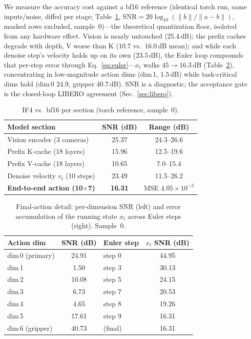 \documentclass[11pt]{article}
\newcommand{\iffour}{IF4}
\newcommand{\bfteen}{bf16}
\begin{document}
We measure the accuracy cost against a \bfteen{} reference (identical torch run,
same inputs/noise, diffed per stage; Table~\ref{tab:quant},
$\mathrm{SNR}{=}20\log_{10}(\lVert b\rVert/\lVert a{-}b\rVert)$, masked rows
excluded, sample~0)---the theoretical quantization floor, isolated from any
hardware effect. Vision is nearly untouched (25.4\,dB); the prefix caches degrade
with depth, V worse than K ($10.7$ vs.\ $16.0$\,dB mean); and while each
denoise step's velocity holds up on its own ($23.5$\,dB), the Euler loop
compounds that per-step error through Eq.~\eqref{eq:euler}---$x_t$
walks $45\!\to\!16.3$\,dB (Table~\ref{tab:quant-detail}), concentrating in
low-magnitude action dims (dim\,1, $1.5$\,dB) while task-critical dims hold
(dim\,0 $24.9$, gripper $40.7$\,dB). SNR is a diagnostic; the acceptance gate is
the closed-loop LIBERO agreement (Sec.~\ref{sec:libero}).

\begin{table}[H]
\centering\small
\caption{\iffour{} vs.\ \bfteen{} per section (torch reference, sample~0).}
\label{tab:quant}
\begin{tabular}{@{}lcc@{}}
\toprule
\textbf{Model section} & \textbf{SNR (dB)} & \textbf{Range (dB)} \\
\midrule
Vision encoder (3 cameras)      & 25.37 & 24.3--26.6 \\
Prefix K-cache (18 layers)      & 15.96 & 12.5--19.6 \\
Prefix V-cache (18 layers)      & 10.65 & 7.0--15.4 \\
Denoise velocity $v_t$ (10 steps) & 23.49 & 11.5--26.2 \\
\midrule
\textbf{End-to-end action (10$\times$7)} & \textbf{16.31} & MSE $4.05{\times}10^{-3}$ \\
\bottomrule
\end{tabular}
\end{table}

\begin{table}[H]
\centering\small
\caption{Final-action detail: per-dimension SNR (left) and error accumulation of
the running state $x_t$ across Euler steps (right). Sample~0.}
\label{tab:quant-detail}
\begin{tabular}{@{}lc@{\hspace{1.5em}}lc@{}}
\toprule
\textbf{Action dim} & \textbf{SNR (dB)} & \textbf{Euler step} & \textbf{$x_t$ SNR (dB)} \\
\midrule
dim\,0 (primary) & 24.91 & step 0 & 44.95 \\
dim\,1           & 1.50  & step 3 & 30.13 \\
dim\,2           & 10.08 & step 5 & 24.15 \\
dim\,3           & 6.73  & step 7 & 20.53 \\
dim\,4           & 4.65  & step 8 & 19.26 \\
dim\,5           & 17.61 & step 9 & 16.31 \\
dim\,6 (gripper) & 40.73 & (final) & 16.31 \\
\bottomrule
\end{tabular}
\end{table}
\end{document}
